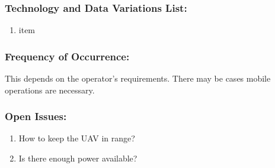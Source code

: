\documentclass[ProductRequirements.tex]{subfiles}
\begin{document}
	\subsubsection*{Technology and Data Variations List:}
	\begin{enumerate}\itemsep1pt
		\item item
	\end{enumerate}
	\subsubsection*{Frequency of Occurrence:}
	This depends on the operator's requirements. There may be cases mobile operations are necessary.
	\subsubsection*{Open Issues:}
	\begin{enumerate}\itemsep1pt
		\item How to keep the UAV in range?
		\item Is there enough power available?
	\end{enumerate}		

		
\end{document}

